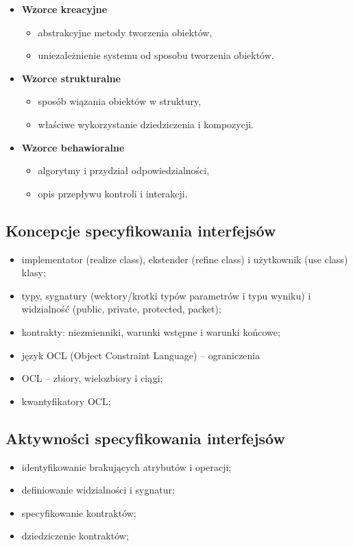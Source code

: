\documentclass[a4paper]{article}
\begin{document}
    \begin{itemize}
        \item \textbf{Wzorce kreacyjne}
        \begin{itemize}
            \item abstrakcyjne metody tworzenia obiektów,
            \item uniezależnienie systemu od sposobu tworzenia obiektów.
        \end{itemize}
        \item \textbf{Wzorce strukturalne}
        \begin{itemize}
            \item sposób wiązania obiektów w struktury,
            \item właściwe wykorzystanie dziedziczenia i kompozycji.
        \end{itemize}
        \item \textbf{Wzorce behawioralne}
        \begin{itemize}
            \item algorytmy i przydział odpowiedzialności,
            \item opis przepływu kontroli i interakcji.
        \end{itemize}
    \end{itemize}

    \subsection{Koncepcje specyfikowania interfejsów}
    \begin{itemize}
        \item implementator (realize class), ekstender (refine class) i użytkownik (use class) klasy;
        \item typy, sygnatury (wektory/krotki typów parametrów i typu wyniku) i widzialność (public, private, protected, packet);
        \item kontrakty: niezmienniki, warunki wstępne i warunki końcowe;
        \item język OCL (Object Constraint Language) – ograniczenia
        \item OCL – zbiory, wielozbiory i ciągi;
        \item kwantyfikatory OCL;
    \end{itemize}

    \subsection{Aktywności specyfikowania interfejsów}
    \begin{itemize}
        \item identyfikowanie brakujących atrybutów i operacji;
        \item definiowanie widzialności i sygnatur;
        \item specyfikowanie kontraktów;
        \item dziedziczenie kontraktów;
    \end{itemize}
\end{document}
